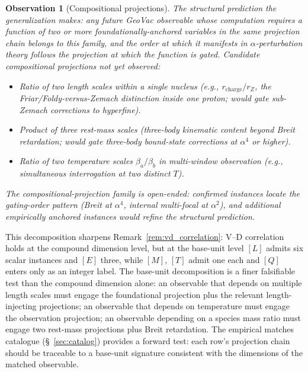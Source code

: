\documentclass[11pt]{article}
\newtheorem{observation}{Observation}
\begin{document}
\begin{observation}[Compositional projections]
The structural prediction the generalization makes: any future
GeoVac observable whose computation requires a function of two or
more foundationally-anchored variables in the same projection chain
belongs to this family, and the order at which it manifests in
$\alpha$-perturbation theory follows the projection at which the
function is gated.  Candidate compositional projections not yet
observed:

\begin{itemize}\setlength\itemsep{0pt}
\item Ratio of two length scales within a single nucleus (e.g.,
$r_\text{charge} / r_Z$, the Friar/Foldy-versus-Zemach distinction
inside one proton; would gate sub-Zemach corrections to hyperfine).
\item Product of three rest-mass scales (three-body kinematic
content beyond Breit retardation; would gate three-body bound-state
corrections at $\alpha^4$ or higher).
\item Ratio of two temperature scales $\beta_a / \beta_b$ in
multi-window observation (e.g., simultaneous interrogation at two
distinct $T$).
\end{itemize}

The compositional-projection family is open-ended: confirmed
instances locate the gating-order pattern (Breit at $\alpha^4$,
internal multi-focal at $\alpha^2$), and additional empirically
anchored instances would refine the structural prediction.
\end{observation}

This decomposition sharpens
Remark~\ref{rem:vd_correlation}: V--D correlation holds at the
compound dimension level, but at the base-unit level $[L]$ admits
six scalar instances and $[E]$ three, while $[M]$, $[T]$ admit one each
and $[Q]$ enters only as an integer label.  The base-unit
decomposition is a finer falsifiable test than the compound
dimension alone: an observable that depends on multiple length
scales must engage the foundational projection plus the relevant
length-injecting projections; an observable that depends on
temperature must engage the observation projection; an observable
depending on a species mass ratio must engage two rest-mass
projections plus Breit retardation.  The empirical matches
catalogue (\S~\ref{sec:catalog}) provides a forward test:
each row's projection chain should be traceable to a base-unit
signature consistent with the dimensions of the matched
observable.

\end{document}
